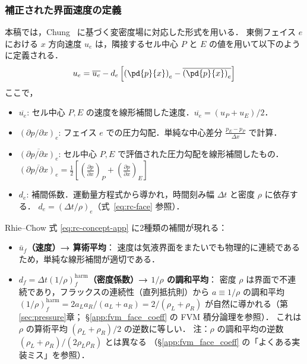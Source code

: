 \subsubsection{補正された界面速度の定義}
本稿では，Chung~\cite{Chung2002} に基づく変密度場に対応した形式を用いる．
東側フェイス $e$ における $x$ 方向速度 $u_e$ は，隣接するセル中心 $P$ と $E$ の値を用いて以下のように定義される．
\begin{equation}
 u_e = \overline{u_e} - d_e \left[ \left(\pd{p}{x}\right)_e - \overline{\left(\pd{p}{x}\right)_e} \right]
 \label{eq:rc-concept-app}
\end{equation}
ここで，
\begin{itemize}
    \item $\overline{u_e}$: セル中心 $P, E$ の速度を線形補間した速度．$\overline{u_e} = (u_P+u_E)/2$．
    \item $(\partial p/\partial x)_e$: フェイス $e$ での圧力勾配．単純な中心差分 $\frac{p_E-p_P}{\Delta x}$ で計算．
    \item $\overline{(\partial p/\partial x)_e}$: セル中心 $P, E$ で評価された圧力勾配を線形補間したもの．
    $\overline{(\partial p/\partial x)_e} = \frac{1}{2}\left[ \left(\frac{\partial p}{\partial x}\right)_P + \left(\frac{\partial p}{\partial x}\right)_E \right]$
    \item $d_e$: 補間係数．運動量方程式から導かれ，時間刻み幅 $\Delta t$ と密度 $\rho$ に依存する．
    $d_e = (\Delta t / \rho)_e$（式~\eqref{eq:rc-face} 参照）．
\end{itemize}

Rhie--Chow 式 \eqref{eq:rc-concept-app} に2種類の補間が現れる：
\begin{itemize}
  \item \textbf{$\bar{u}_f$（速度）→ 算術平均}：
    速度は気液界面をまたいでも物理的に連続であるため，単純な線形補間が適切である．
  \item \textbf{$d_f = \Delta t (1/\rho)_f^{\mathrm{harm}}$（密度係数）→ $1/\rho$ の調和平均}：
    密度 $\rho$ は界面で不連続であり，フラックスの連続性（直列抵抗則）から
    $a \equiv 1/\rho$ の調和平均
    $(1/\rho)_f^{\mathrm{harm}} = 2a_La_R/(a_L+a_R) = 2/(\rho_L+\rho_R)$
    が自然に導かれる（第\ref{sec:pressure}章；
    §\ref{app:fvm_face_coeff} の FVM 積分論理を参照）．
    これは $\rho$ の算術平均 $(\rho_L+\rho_R)/2$ の逆数に等しい．
    注：$\rho$ の調和平均の逆数 $(\rho_L+\rho_R)/(2\rho_L\rho_R)$ とは異なる
    （§\ref{app:fvm_face_coeff} の「よくある実装ミス」を参照）．
\end{itemize}

